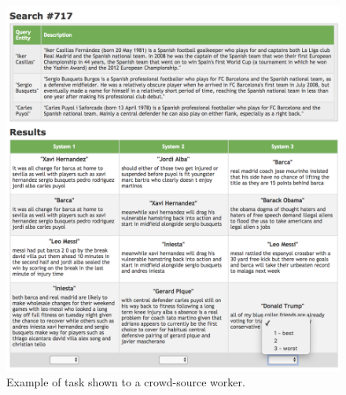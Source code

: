 \documentclass[a4paper]{article}
\begin{document}
\begin{figure}[t]%
  \centering
  \includegraphics[width=\columnwidth,trim=0 10 0 0,clip]{rank_three_lists_hit.png}
  \caption{Example of task shown to a crowd-source worker.} %
  \label{fig:hit_system}
\end{figure}
\end{document}
